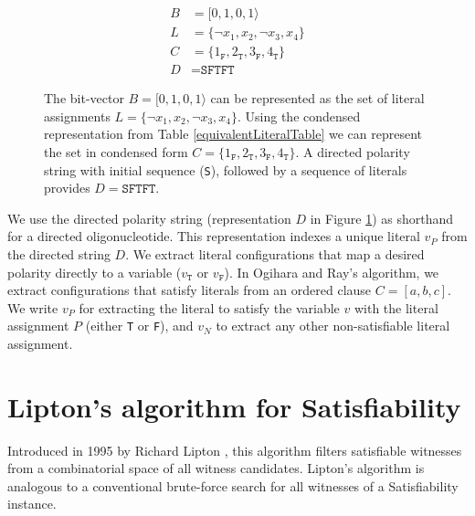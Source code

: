 \begin{figure}[htbp]
\begin{center}

	\begin{align*}
	B &= [0, 1, 0, 1 \rangle \\
	L &= \{ \neg x_1, x_2, \neg x_3, x_4 \} \\
	C &= \{ 1_{\texttt{F}}, 2_{\texttt{T}}, 3_{\texttt{F}}, 4_{\texttt{T}} \} \\
	D &= \texttt{SFTFT} 
	\end{align*}

\caption{The bit-vector $B = [0, 1, 0, 1 \rangle$ can be represented as the set of literal assignments $L = \{ \neg x_1, x_2, \neg x_3, x_4 \}$.  Using the condensed representation from Table \ref{equivalentLiteralTable} we can represent the set in condensed form $C = \{ 1_{\texttt{F}}, 2_{\texttt{T}}, 3_{\texttt{F}}, 4_{\texttt{T}} \}$.  A directed polarity string with initial sequence (\texttt{S}), followed by a sequence of literals provides $D = \texttt{SFTFT}$.}
\label{equivalentWitnessRepresentations}
\end{center}
\end{figure}

\FloatBarrier

We use the directed polarity string (representation $D$ in Figure \ref{equivalentWitnessRepresentations}) as shorthand for a directed oligonucleotide.  This representation indexes a unique literal $v_P$ from the directed string $D$.  We extract literal configurations that map a desired polarity directly to a variable ($v_{\texttt{T}}$ or $v_{\texttt{F}}$).  In Ogihara and Ray's algorithm, we extract configurations that satisfy literals from an ordered clause $C = [a, b, c]$.  We write $v_P$ for extracting the literal to satisfy the variable $v$ with the literal assignment $P$ (either \texttt{T} or \texttt{F}), and $v_N$ to extract any other non-satisfiable literal assignment.

\section{Lipton's algorithm for {\sc Satisfiability}}


Introduced in 1995 by Richard Lipton \cite{Lipton95usingdna}, this algorithm filters satisfiable witnesses from a combinatorial space of all witness candidates.  Lipton's algorithm is analogous to a conventional brute-force search for all witnesses of a {\sc Satisfiability} instance.

